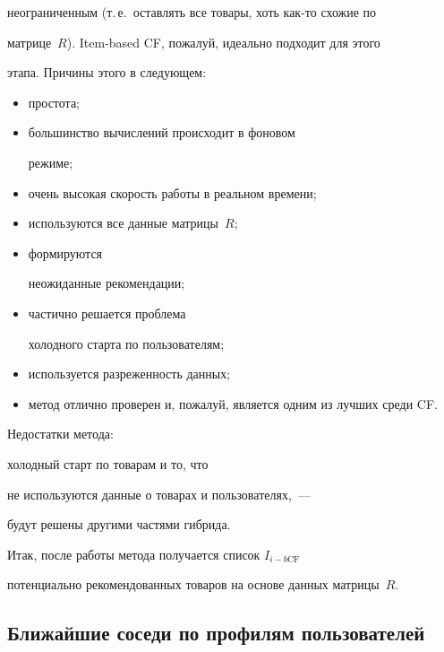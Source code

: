 неограниченным (т.\,е.\ оставлять все товары, хоть как-то схожие по


мат\-ри\-це~$R$). Item-based CF, пожалуй, идеально подходит для этого


этапа. Причины этого в следующем:


\begin{itemize}




\item простота; 


\item большинство вычислений происходит в фоновом


режиме; 


\item очень высокая скорость работы в реальном времени;


\item используются все данные мат\-ри\-цы~$R;$ 


\item формируются


неожиданные рекомендации; 


\item частично решается проблема


холодного старта по пользователям; 


\item используется разреженность данных; 


\item метод отлично проверен и, пожалуй, является одним из лучших среди CF.


\end{itemize}





Недостатки метода:


холодный старт по товарам и то, что 


не используются данные о товарах и пользователях,~---


будут решены другими частями гибрида.





Итак, после работы метода получается список $I_{i-b\mathrm{CF}}$


потенциально рекомендованных товаров на основе данных мат\-ри\-цы~$R.$





\subsection{Ближайшие соседи по профилям пользователей}





